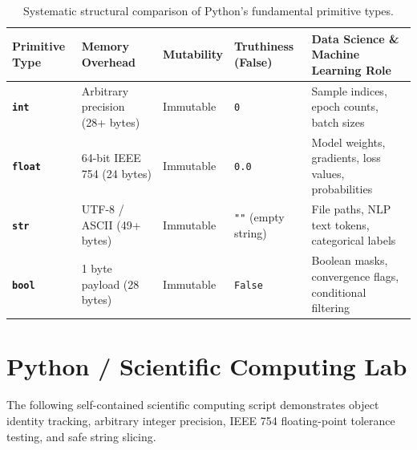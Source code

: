\begin{table}[htbp]
\centering
\small
\begin{tabular}{p{2.2cm} p{2.2cm} p{2.2cm} p{2.5cm} p{3.8cm}}
\toprule
\textbf{Primitive Type} & \textbf{Memory Overhead} & \textbf{Mutability} & \textbf{Truthiness (False)} & \textbf{Data Science \& Machine Learning Role} \\
\midrule
\textbf{\texttt{int}} & Arbitrary precision (28+ bytes) & Immutable & \texttt{0} & Sample indices, epoch counts, batch sizes \\
\textbf{\texttt{float}} & 64-bit IEEE 754 (24 bytes) & Immutable & \texttt{0.0} & Model weights, gradients, loss values, probabilities \\
\textbf{\texttt{str}} & UTF-8 / ASCII (49+ bytes) & Immutable & \texttt{""} (empty string) & File paths, NLP text tokens, categorical labels \\
\textbf{\texttt{bool}} & 1 byte payload (28 bytes) & Immutable & \texttt{False} & Boolean masks, convergence flags, conditional filtering \\
\bottomrule
\end{tabular}
\caption{Systematic structural comparison of Python's fundamental primitive types.}
\label{tab:python_primitives_comparison}
\end{table}

\section{Python / Scientific Computing Lab}

The following self-contained scientific computing script demonstrates object identity tracking, arbitrary integer precision, IEEE 754 floating-point tolerance testing, and safe string slicing.

